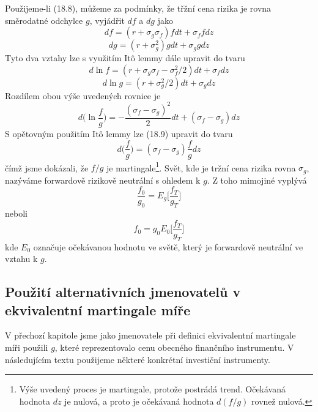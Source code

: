\documentclass[a4paper]{book}
\begin{document}
Použijeme-li (18.8), můžeme za podmínky, že třžní cena rizika je rovna směrodatné odchylce $g$, vyjádřit $df$ a $dg$ jako
\begin{equation*}
df = (r + \sigma_g \sigma_f)f dt + \sigma_f fdz
\end{equation*}
\begin{equation*}
dg = (r + \sigma_g^2)g dt + \sigma_g gdz
\end{equation*}
Tyto dva vztahy lze s využitím It\^o lemmy dále upravit do tvaru
\begin{equation*}
d \ln f = (r + \sigma_g \sigma_f - \sigma_f^2/2)dt + \sigma_f dz
\end{equation*}
\begin{equation*}
d \ln g = (r + \sigma_g^2/2)dt + \sigma_g dz
\end{equation*}
Rozdílem obou výše uvedených rovnice je
\begin{equation}
d \Bigg( \ln \frac{f}{g} \Bigg) = - \frac{(\sigma_f - \sigma_g)^2}{2}dt + (\sigma_f - \sigma_g)dz 
\end{equation}
S opětovným použitím It\^o lemmy lze (18.9) upravit do tvaru
\begin{equation*}
d \Bigg( \frac{f}{g} \Bigg) = (\sigma_f - \sigma_g) \frac{f}{g}dz
\end{equation*}
čímž jsme dokázali, že $f/g$ je martingale\footnote{Výše uvedený proces je martingale, protože postrádá trend. Očekávaná hodnota $dz$ je nulová, a proto je očekávaná hodnota $d(f/g)$ rovnež nulová.}. Svět, kde je tržní cena rizika rovna $\sigma_g$, nazýváme forwardově rizikově neutrální s ohledem k $g$. Z toho mimojiné vyplývá
\begin{equation*}
\frac{f_0}{g_0}=E_g\Bigg[ \frac{f_T}{g_T} \Bigg]
\end{equation*}
neboli
\begin{equation}
f_0 = g_0 E_0 \Bigg[ \frac{f_T}{g_T} \Bigg]
\end{equation}
kde $E_0$ označuje očekávanou hodnotu ve světě, který je forwardově neutrální ve vztahu k $g$.

\subsection{Použití alternativních jmenovatelů v ekvivalentní martingale míře}

V přechozí kapitole jsme jako jmenovatele při definici ekvivalentní martingale míři použili $g$, které reprezentovalo cenu obecného finančního instrumentu. V následujícím textu použijeme některé konkrétní investiční instrumenty.\\
\end{document}
